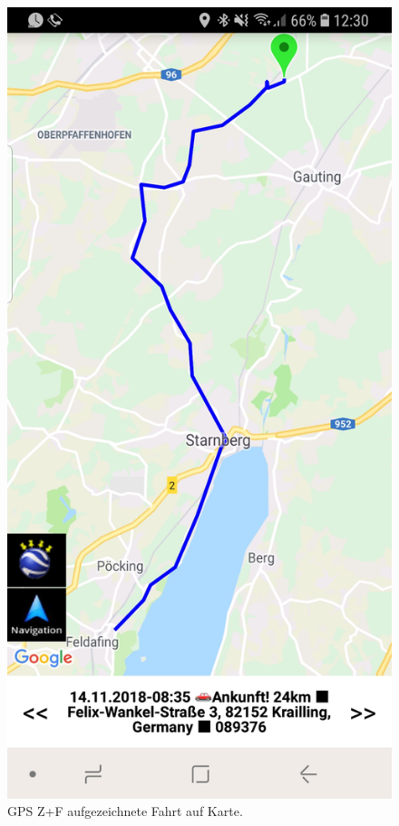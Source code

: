 \begin{figure}[H]
\begin{minipage}[b]{.4\linewidth}
        \includegraphics[scale=0.14]{img/gps4}
        \caption{\label{img:img/gps4}GPS Z+F aufgezeichnete Fahrt auf Karte.}
    \end{minipage}
\end{figure}

